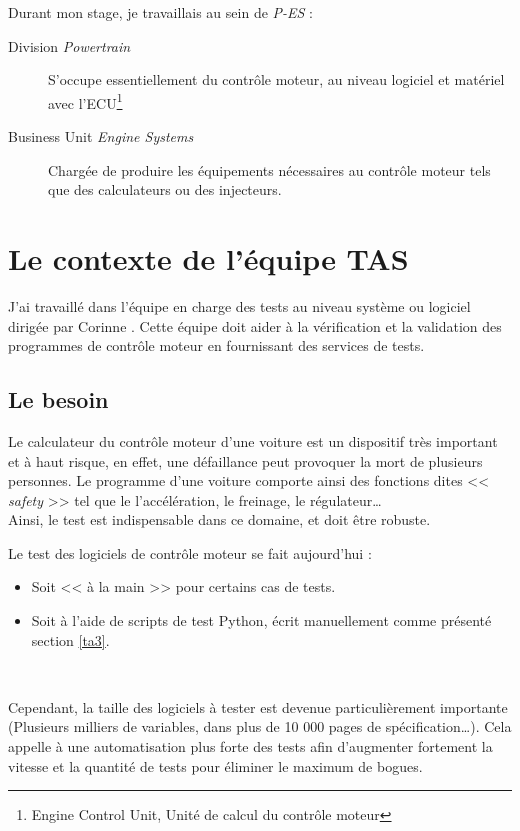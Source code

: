 Durant mon stage, je travaillais au sein de \textit{P-ES} : 
\begin{description}
	\item[Division \textit{Powertrain}] S'occupe essentiellement du contrôle moteur, au niveau logiciel et matériel avec l'ECU\footnote{Engine Control Unit, Unité de calcul du contrôle moteur}
	\item[Business Unit \textit{Engine Systems}] Chargée de produire les équipements nécessaires au contrôle moteur tels que des calculateurs ou des injecteurs.
\end{description}

\section{Le contexte de l'équipe TAS}
J'ai travaillé dans l'équipe en charge des tests au niveau système ou logiciel dirigée par Corinne . Cette équipe doit aider à la vérification et la validation des programmes de contrôle moteur en fournissant des services de tests. 

\subsection{Le besoin} \label{besoinTests}
Le calculateur du contrôle moteur d'une voiture est un dispositif très important et à haut risque, en effet, une défaillance peut provoquer la mort de plusieurs personnes. Le programme d'une voiture comporte ainsi des fonctions dites << \textit{safety} >> tel que le l'accélération, le freinage, le régulateur\ldots\\
Ainsi, le test est indispensable dans ce domaine, et doit être robuste. 

Le test des logiciels de contrôle moteur se fait aujourd'hui : 
\begin{itemize}
	\item Soit << à la main >> pour certains cas de tests.
	\item Soit à l'aide de scripts de test Python, écrit manuellement comme présenté section \ref{ta3}.
\end{itemize}~

Cependant, la taille des logiciels à tester est devenue particulièrement importante (Plusieurs milliers de variables, dans plus de 10 000 pages de spécification\ldots). Cela appelle à une automatisation plus forte des tests afin d'augmenter fortement la vitesse et la quantité de tests pour éliminer le maximum de bogues.

